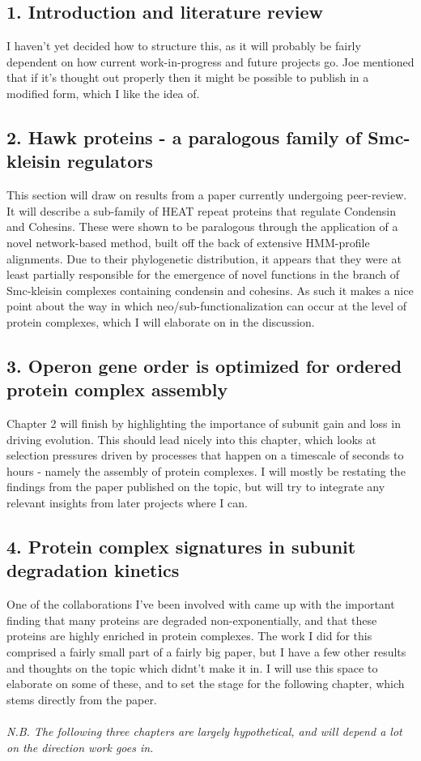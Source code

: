 \documentclass{article}
\begin{document}
\subsection*{1. Introduction and literature review}
I haven't yet decided how to structure this, as it will probably be fairly dependent on how current work-in-progress and future projects go. Joe mentioned that if it's thought out properly then it might be possible to publish in a modified form, which I like the idea of.

\subsection*{2. Hawk proteins - a paralogous family of Smc-kleisin regulators}
This section will draw on results from a paper currently undergoing peer-review. It will describe a sub-family of HEAT repeat proteins that regulate Condensin and Cohesins. These were shown to be paralogous through the application of a novel network-based method, built off the back of extensive HMM-profile alignments. Due to their phylogenetic distribution, it appears that they were at least partially responsible for the emergence of novel functions in the branch of Smc-kleisin complexes containing condensin and cohesins. As such it makes a nice point about the way in which neo/sub-functionalization can occur at the level of protein complexes, which I will elaborate on in the discussion.

\subsection*{3. Operon gene order is optimized for ordered protein complex assembly}
Chapter 2 will finish by highlighting the importance of subunit gain and loss in driving evolution. This should lead nicely into this chapter, which looks at selection pressures driven by processes that happen on a timescale of seconds to hours - namely the assembly of protein complexes. I will mostly be restating the findings from the paper published on the topic, but will try to integrate any relevant insights from later projects where I can.

\subsection*{4. Protein complex signatures in subunit degradation kinetics}
One of the collaborations I've been involved with came up with the important finding that many proteins are degraded non-exponentially, and that these proteins are highly enriched in protein complexes. The work I did for this comprised a fairly small part of a fairly big paper, but I have a few other results and thoughts on the topic which didnt't make it in. I will use this space to elaborate on some of these, and to set the stage for the following chapter, which stems directly from the paper.
\\~\\
\textit{N.B. The following three chapters are largely hypothetical, and will depend a lot on the direction work goes in.}
\end{document}
